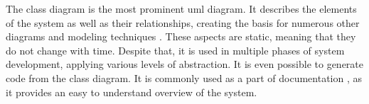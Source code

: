 


The class diagram is the most prominent \ac{uml} diagram. It describes the elements of the system as well as their relationships, creating the basis for numerous other diagrams and modeling techniques \cite{rumpe2016modeling}. These aspects are static, meaning that they do not change with time. Despite that, it is used in multiple phases of system development, applying various levels of abstraction. 
It is even possible to generate code from the class diagram. It is commonly used as a part of documentation \cite{seidl2015uml}, as it provides an easy to understand overview of the system. %





